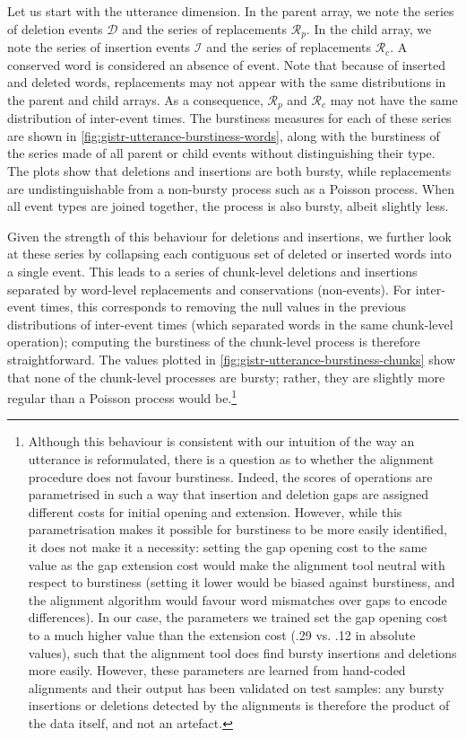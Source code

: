 Let us start with the utterance dimension. In the parent array, we note
the series of deletion events \(\mathcal{D}\) and the series of
replacements \(\mathcal{R}_p\). In the child array, we note the series
of insertion events \(\mathcal{I}\) and the series of replacements
\(\mathcal{R}_c\). A conserved word is considered an absence of event.
Note that because of inserted and deleted words, replacements may not
appear with the same distributions in the parent and child arrays. As a
consequence, \(\mathcal{R}_p\) and \(\mathcal{R}_c\) may not have the
same distribution of inter-event times. The burstiness measures for each
of these series are shown in
\cref{fig:gistr-utterance-burstiness-words}, along with the burstiness
of the series made of all parent or child events without distinguishing
their type. The plots show that deletions and insertions are both
bursty, while replacements are undistinguishable from a non-bursty
process such as a Poisson process. When all event types are joined
together, the process is also bursty, albeit slightly less.

Given the strength of this behaviour for deletions and insertions, we
further look at these series by collapsing each contiguous set of
deleted or inserted words into a single event. This leads to a series of
chunk-level deletions and insertions separated by word-level
replacements and conservations (non-events). For inter-event times, this
corresponds to removing the null values in the previous distributions of
inter-event times (which separated words in the same chunk-level
operation); computing the burstiness of the chunk-level process is
therefore straightforward. The values plotted in
\cref{fig:gistr-utterance-burstiness-chunks} show that none of the
chunk-level processes are bursty; rather, they are slightly more regular
than a Poisson process would be.\footnote{ 
Although this behaviour is consistent with our intuition of the way an
utterance is reformulated, there is a question as to whether the
alignment procedure does not favour burstiness. Indeed, the scores of
operations are parametrised in such a way that insertion and deletion
gaps are assigned different costs for initial opening and extension.
However, while this parametrisation makes it possible for burstiness to
be more easily identified, it does not make it a necessity: setting the
gap opening cost to the same value as the gap extension cost would make
the alignment tool neutral with respect to burstiness (setting it lower
would be biased against burstiness, and the alignment algorithm would
favour word mismatches over gaps to encode differences). In our case,
the parameters we trained set the gap opening cost to a much higher
value than the extension cost (.29 vs. .12 in absolute values), such
that the alignment tool does find bursty insertions and deletions more
easily. However, these parameters are learned from hand-coded alignments
and their output has been validated on test samples: any bursty
insertions or deletions detected by the alignments is therefore the
product of the data itself, and not an artefact.}


